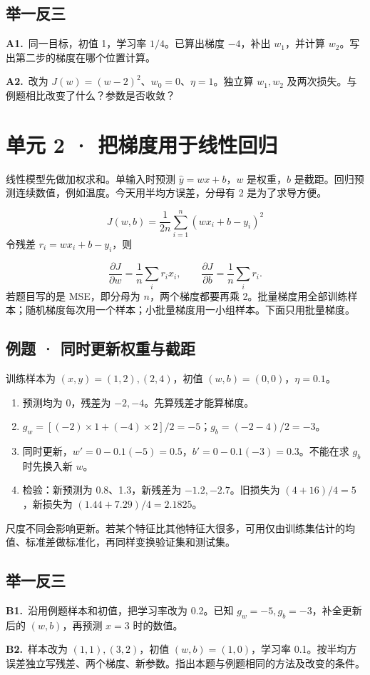\documentclass[UTF8,a4paper,11pt]{ctexart}
\newcommand{\PracticeQuestion}[3]{\par\Needspace{4\baselineskip}\noindent\begin{minipage}{\linewidth}\textbf{#1.}\ #2\par\noindent\rule{0pt}{#3mm}\par\end{minipage}\par}
\begin{document}
\subsection{举一反三}
\PracticeQuestion{A1}{同一目标，初值 1，学习率 $1/4$。已算出梯度 $-4$，补出 $w_1$，并计算 $w_2$。写出第二步的梯度在哪个位置计算。}{23}
\PracticeQuestion{A2}{改为 $J(w)=(w-2)^2$、$w_0=0$、$\eta=1$。独立算 $w_1,w_2$ 及两次损失。与例题相比改变了什么？参数是否收敛？}{26}
\clearpage
\section{单元 2 · 把梯度用于线性回归}
线性模型先做加权求和。单输入时预测 $\hat y=wx+b$，$w$ 是权重，$b$ 是截距。回归预测连续数值，例如温度。今天用半均方误差，分母有 2 是为了求导方便。

\[J(w,b)=\frac{1}{2n}\sum_{i=1}^{n}(wx_i+b-y_i)^2\]
令残差 $r_i=wx_i+b-y_i$，则

\[\frac{\partial J}{\partial w}=\frac{1}{n}\sum_i r_ix_i,\qquad \frac{\partial J}{\partial b}=\frac{1}{n}\sum_i r_i.\]
若题目写的是 MSE，即分母为 $n$，两个梯度都要再乘 2。批量梯度用全部训练样本；随机梯度每次用一个样本；小批量梯度用一小组样本。下面只用批量梯度。

\subsection{例题 · 同时更新权重与截距}
训练样本为 $(x,y)=(1,2),(2,4)$，初值 $(w,b)=(0,0)$，$\eta=0.1$。

\begin{enumerate}
\item 预测均为 0，残差为 $-2,-4$。先算残差才能算梯度。
\item $g_w=[(-2)\times1+(-4)\times2]/2=-5$；$g_b=(-2-4)/2=-3$。
\item 同时更新，$w'=0-0.1(-5)=0.5$，$b'=0-0.1(-3)=0.3$。不能在求 $g_b$ 时先换入新 $w$。
\item 检验：新预测为 0.8、1.3，新残差为 $-1.2,-2.7$。旧损失为 $(4+16)/4=5$，新损失为 $(1.44+7.29)/4=2.1825$。
\end{enumerate}
尺度不同会影响更新。若某个特征比其他特征大很多，可用仅由训练集估计的均值、标准差做标准化，再同样变换验证集和测试集。

\subsection{举一反三}
\PracticeQuestion{B1}{沿用例题样本和初值，把学习率改为 0.2。已知 $g_w=-5,g_b=-3$，补全更新后的 $(w,b)$，再预测 $x=3$ 时的数值。}{24}
\PracticeQuestion{B2}{样本改为 $(1,1),(3,2)$，初值 $(w,b)=(1,0)$，学习率 0.1。按半均方误差独立写残差、两个梯度、新参数。指出本题与例题相同的方法及改变的条件。}{34}
\clearpage
\end{document}
